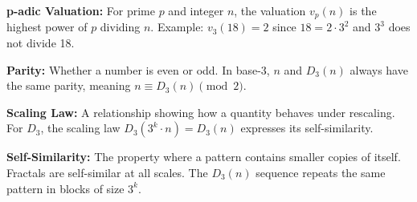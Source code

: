 \noindent\textbf{p-adic Valuation:} For prime $p$ and integer $n$, the valuation $v_p(n)$ is the highest power of $p$ dividing $n$. Example: $v_3(18) = 2$ since $18 = 2 \cdot 3^2$ and $3^3$ does not divide 18.

\noindent\textbf{Parity:} Whether a number is even or odd. In base-3, $n$ and $D_3(n)$ always have the same parity, meaning $n \equiv D_3(n) \pmod{2}$.

\noindent\textbf{Scaling Law:} A relationship showing how a quantity behaves under rescaling. For $D_3$, the scaling law $D_3(3^k \cdot n) = D_3(n)$ expresses its self-similarity.

\noindent\textbf{Self-Similarity:} The property where a pattern contains smaller copies of itself. Fractals are self-similar at all scales. The $D_3(n)$ sequence repeats the same pattern in blocks of size $3^k$.

